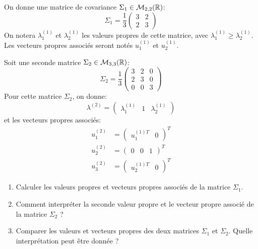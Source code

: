 \documentclass[solutions]{../exercices}
\begin{document}
	
	\begin{exercice}
		On donne une matrice de covariance $\Sigma_1 \in \mathcal{M}_{2,2}(\mathbb{R})$:
		\begin{equation*}
			\Sigma_1 = \frac{1}{3}\begin{pmatrix}3 & 2 \\ 2 & 3 \end{pmatrix}
		\end{equation*}
		On notera $\lambda_1^{(1)}$ et $\lambda_2^{(1)}$ les valeurs propres de cette matrice, avec $\lambda_1^{(1)} \ge \lambda_2^{(1)}$.
		Les vecteurs propres associés seront notés $u_1^{(1)}$ et $u_2^{(1)}$.
		
		Soit une seconde matrice $\Sigma_2 \in \mathcal{M}_{3,3}(\mathbb{R})$:
		\begin{equation*}
			\Sigma_2 = \frac{1}{3}\begin{pmatrix}3 & 2 & 0 \\ 2 & 3 & 0 \\ 0 & 0 & 3\end{pmatrix}
		\end{equation*}
		Pour cette matrice $\Sigma_2$, on donne:
		\begin{equation*}
			\lambda^{(2)} = \begin{pmatrix}\lambda_1^{(1)} & 1 & \lambda_2^{(1)}\end{pmatrix}
		\end{equation*}
		et les vecteurs propres associés:
		\begin{equation*}
			\begin{aligned}
				u_1^{(2)} &= \begin{pmatrix}u_1^{(1)T} & 0 \end{pmatrix}^T \\
				u_2^{(2)} &= \begin{pmatrix}0 & 0 & 1\end{pmatrix}^T \\
				u_3^{(2)} &= \begin{pmatrix}u_2^{(1)T} & 0 \end{pmatrix}^T
			\end{aligned}
		\end{equation*}
		\begin{enumerate}
			\item Calculer les valeurs propres et vecteurs propres associés de la matrice $\Sigma_1$.
			\item Comment interpréter la seconde valeur propre et le vecteur propre associé de la matrice $\Sigma_2$ ?
			\item Comparer les valeurs et vecteurs propres des deux matrices $\Sigma_1$ et $\Sigma_2$. Quelle interprétation peut être donnée ?
		\end{enumerate}
	\end{exercice}
	
\end{document}
